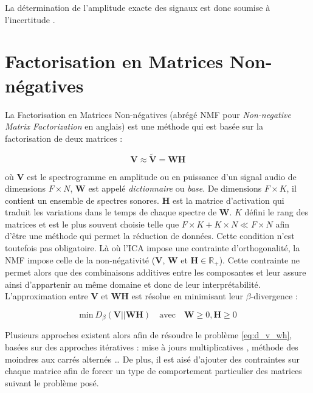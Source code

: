 La détermination de l'amplitude exacte des signaux est donc soumise à l'incertitude \cite{naik2011overview}. 



\section{Factorisation en Matrices Non-négatives}

La Factorisation en Matrices Non-négatives (abrégé NMF pour \textit{Non-negative Matrix Factorization} en anglais) \cite{lee_learning_1999} est une méthode qui est basée sur la factorisation de deux matrices : 

\begin{equation}
\mathbf{V} \approx \mathbf{\tilde{V}} = \mathbf{WH}
\end{equation}

où $\mathbf{V}$ est le spectrogramme en amplitude ou en puissance d'un signal audio de dimensions $F \times N$, $\mathbf{W}$ est appelé \textit{dictionnaire} ou \textit{base}. De dimensions $F \times K$, il contient un ensemble de spectres sonores. $\mathbf{H}$ est la matrice d'activation qui traduit les variations dans le temps de chaque spectre de $\mathbf{W}$.  $K$ défini le rang des matrices et est le plus souvent choisie telle que $F\times K + K \times N \ll F \times N$ afin d'être une méthode qui permet la réduction de données. Cette condition n'est toutefois pas obligatoire.
Là où l'ICA impose une contrainte d'orthogonalité, la NMF impose celle de la \og non-négativité \fg{} ($\mathbf{V}$, $\mathbf{W}$ et $\mathbf{H} \in \mathbb{R}_+$). Cette contrainte ne permet alors que des combinaisons additives entre les composantes et leur assure ainsi d'appartenir au même domaine et donc de leur interprétabilité.
L'approximation entre $\mathbf{V}$ et $\mathbf{WH}$ est résolue en minimisant leur $\beta$-divergence : 

\begin{equation}\label{eq:d_v_wh}
\text{min}~D_{\beta}\left(\textbf{V} \vert\vert \textbf{WH}\right) \quad \text{avec} \quad \mathbf{W} \geq 0, \mathbf{H} \geq 0 
\end{equation}

Plusieurs approches existent alors afin de résoudre le problème \ref{eq:d_v_wh}, basées sur des approches itératives : mise à jours multiplicatives \cite{lee_algorithms_2000}, méthode des moindres aux carrés alternés \cite{cichocki_regularized_2007} \dots{} De plus, il est aisé d'ajouter des contraintes sur chaque matrice \cite{virtanen_monaural_2007} afin de forcer un type de comportement particulier des matrices suivant le problème posé.


